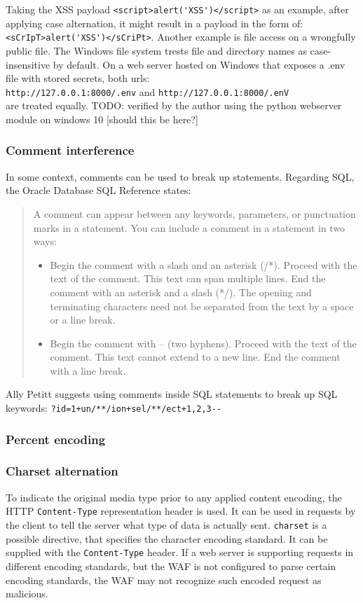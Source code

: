 Taking the XSS payload \verb|<script>alert('XSS')</script>| as an example, after applying case alternation, it might result in a payload in the form of: \verb|<sCrIpT>alert('XSS')</sCriPt>|.
Another example is file access on a wrongfully public file.
The Windows file system trests file and directory names as case-insensitive by default. \cite{windows/casesensitive}
On a web server hosted on Windows that exposes a .env file with stored secrets, both urls: \\ \verb|http://127.0.0.1:8000/.env| and \verb|http://127.0.0.1:8000/.enV| \\
are treated equally. {\color{red}TODO: verified by the author using the python webserver module on windows 10 [should this be here?]}


\subsubsection{Comment interference}
In some context, comments can be used to break up statements. Regarding SQL, the Oracle Database SQL Reference states:
\begin{quote}
	A comment can appear between any keywords, parameters, or punctuation marks in a statement. You can include a comment in a statement in two ways:
	\begin{itemize}
		\item Begin the comment with a slash and an asterisk (/*). Proceed with the text of the comment. This text can span multiple lines. End the comment with an asterisk and a slash (*/). The opening and terminating characters need not be separated from the text by a space or a line break.
		\item Begin the comment with -- (two hyphens). Proceed with the text of the comment. This text cannot extend to a new line. End the comment with a line break.
	\end{itemize}
	\cite{oracle/sqlcomments}
\end{quote}
Ally Petitt suggests using comments inside SQL statements to break up SQL keywords: \verb|?id=1+un/**/ion+sel/**/ect+1,2,3--| \cite{medium/allypetitt}


\subsubsection{Percent encoding}


\subsubsection{Charset alternation}
To indicate the original media type prior to any applied content encoding, the HTTP \verb|Content-Type| representation header is used.
It can be used in requests by the client to tell the server what type of data is actually sent.
\verb|charset| is a possible directive, that specifies the character encoding standard.
It can be supplied with the \verb|Content-Type| header. \cite{http/contenttype}
If a web server is supporting requests in different encoding standards, but the WAF is not configured to parse certain encoding standards, the WAF may not recognize such encoded request as malicious.

